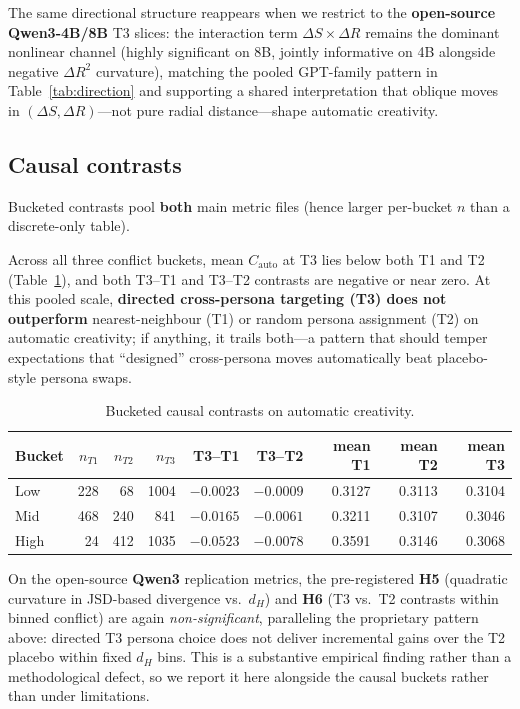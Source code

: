 \documentclass[sigconf,nonacm]{acmart}
\begin{document}
The same directional structure reappears when we restrict to the \textbf{open-source Qwen3-4B/8B} T3 slices: the interaction term $\Delta S{\times}\Delta R$ remains the dominant nonlinear channel (highly significant on 8B, jointly informative on 4B alongside negative $\Delta R^2$ curvature), matching the pooled GPT-family pattern in Table~\ref{tab:direction} and supporting a shared interpretation that oblique moves in $(\Delta S,\Delta R)$---not pure radial distance---shape automatic creativity.

\subsection{Causal contrasts}

Bucketed contrasts pool \textbf{both} main metric files (hence larger per-bucket $n$ than a discrete-only table).

Across all three conflict buckets, mean $C_{\mathrm{auto}}$ at T3 lies below both T1 and T2 (Table~\ref{tab:causal}), and both T3--T1 and T3--T2 contrasts are negative or near zero. At this pooled scale, \textbf{directed cross-persona targeting (T3) does not outperform} nearest-neighbour (T1) or random persona assignment (T2) on automatic creativity; if anything, it trails both---a pattern that should temper expectations that ``designed'' cross-persona moves automatically beat placebo-style persona swaps.

\begin{table}[t]
\centering
\small
\begin{tabular}{lrrrrrrrr}
\toprule
Bucket & $n_{T1}$ & $n_{T2}$ & $n_{T3}$ & T3--T1 & T3--T2 & mean T1 & mean T2 & mean T3 \\
\midrule
Low & 228 & 68 & 1004 & $-0.0023$ & $-0.0009$ & 0.3127 & 0.3113 & 0.3104 \\
Mid & 468 & 240 & 841 & $-0.0165$ & $-0.0061$ & 0.3211 & 0.3107 & 0.3046 \\
High & 24 & 412 & 1035 & $-0.0523$ & $-0.0078$ & 0.3591 & 0.3146 & 0.3068 \\
\bottomrule
\end{tabular}
\caption{Bucketed causal contrasts on automatic creativity.}
\label{tab:causal}
\end{table}

On the open-source \textbf{Qwen3} replication metrics, the pre-registered \textbf{H5} (quadratic curvature in JSD-based divergence vs.\ $d_H$) and \textbf{H6} (T3 vs.\ T2 contrasts within binned conflict) are again \emph{non-significant}, paralleling the proprietary pattern above: directed T3 persona choice does not deliver incremental gains over the T2 placebo within fixed $d_H$ bins.
This is a substantive empirical finding rather than a methodological defect, so we report it here alongside the causal buckets rather than under limitations.
\end{document}
